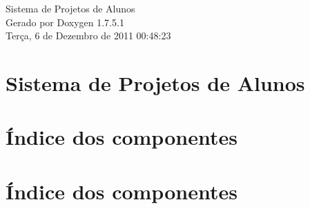 \documentclass[a4paper]{book}
\begin{document}
\hypersetup{pageanchor=false,citecolor=blue}
\begin{titlepage}
\vspace*{7cm}
\begin{center}
{\Large \-Sistema de \-Projetos de \-Alunos }\\
\vspace*{1cm}
{\large \-Gerado por Doxygen 1.7.5.1}\\
\vspace*{0.5cm}
{\small Terça, 6 de Dezembro de 2011 00:48:23}\\
\end{center}
\end{titlepage}
\clearemptydoublepage
{}
\tableofcontents
\clearemptydoublepage
{}
\hypersetup{pageanchor=true,citecolor=blue}
\chapter{\-Sistema de \-Projetos de \-Alunos}
\label{index}\hypertarget{index}{}
\chapter{Índice dos componentes}

\chapter{Índice dos componentes}

\end{document}
